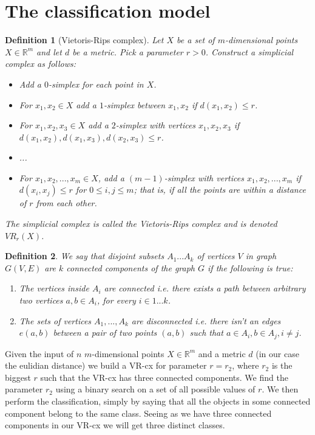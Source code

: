 \documentclass{article}
\newcommand{\enterProblemHeader}[1]{
}
\newcommand{\exitProblemHeader}[1]{
}
\newcounter{homeworkProblemCounter} %
\newcommand{\homeworkProblemName}{}
\newenvironment{homeworkProblem}[1][Problem \arabic{homeworkProblemCounter}]{ %
\stepcounter{homeworkProblemCounter} %
\renewcommand{\homeworkProblemName}{#1} %
\section{\homeworkProblemName} %
\enterProblemHeader{\homeworkProblemName} %
}{
\exitProblemHeader{\homeworkProblemName} %
}
\newtheorem{definition}{Definition}
\begin{document}
\begin{homeworkProblem}[The classification model] \label{prob:model}

\begin{definition}[Vietoris-Rips complex]
\label{defa}
Let $X$ be a set of $m$-dimensional points $X \in \mathbb{R}^{m}$ and let $d$ be a metric. Pick a parameter $r > 0$. Construct a simplicial complex as follows:
\begin{itemize}
	\item Add a $0$-simplex for each point in $X$.
	\item For $x_{1}, x_{2} \in X$ add a $1$-simplex between $x_{1}, x_{2}$ if $d(x_{1}, x_{2}) \leq r$.
	\item For $x_{1}, x_{2}, x_{3} \in X$ add a $2$-simplex with vertices $x_{1}, x_{2}, x_{3}$ if $d(x_{1}, x_{2}), d(x_{1}, x_{3}), d(x_{2}, x_{3}) \leq r$.
	\item ...
	\item For $x_{1}, x_{2}, ... , x_{m} \in X$, add a $(m-1)$-simplex with vertices $x_{1}, x_{2}, ..., x_{m}$ if $d(x_{i}, x_{j}) \leq r$ for $0 \leq i,j \leq m$; that is, if all the points are within a distance of $r$ from each other.
\end{itemize}
The simplicial complex is called the Vietoris-Rips complex and is denoted $VR_{r}(X)$.
\end{definition}

\begin{definition}
We say that disjoint subsets $A_{1}...A_{k}$ of vertices $V$ in graph $G(V,E)$ are $k$ connected components of the graph $G$ if the following is true:
\begin{enumerate}
	\item The vertices inside $A_{i}$ are connected i.e. there exists a path between arbitrary two vertices $a, b \in A_{i}$, for every $i \in 1...k$.
	\item The sets of vertices $A_{1},...,A_{k}$ are disconnected i.e. there isn't an edges $e(a, b)$ between a pair of two points $(a,b)$ such that $a \in A_{i}, b \in A_{j}, i \neq j$.
\end{enumerate}
\end{definition}

Given the input of $n$ $m$-dimensional points $X \in \mathbb{R}^{m}$ and a metric $d$ (in our case the eulidian distance) we build a VR-cx for parameter $r = r_{2}$, where $r_{2}$ is the biggest $r$ such that the VR-cx has three connected components. We find the parameter $r_{2}$ using a binary search on a set of all possible values of $r$. We then perform the classification, simply by saying that all the objects in some connected component belong to the same class. Seeing as we have three connected components in our VR-cx we will get three distinct classes.\\


\end{homeworkProblem}
\end{document}
